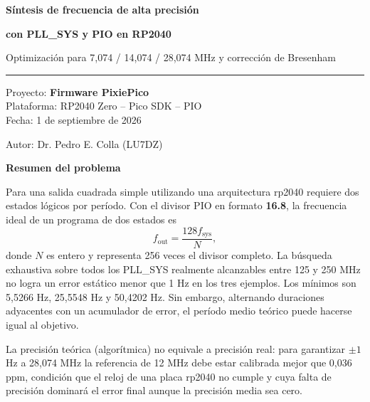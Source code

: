 \documentclass[10pt,a4paper]{article}
\begin{document}
\begin{titlepage}
\centering
\vspace*{14mm}
{\Huge\bfseries\color{navy}Síntesis de frecuencia de alta precisión\par}
\vspace{2mm}
{\Huge\bfseries\color{navy}con PLL\_SYS y PIO en RP2040\par}
\vspace{8mm}
{\large\color{graytext}Optimización para 7,074 / 14,074 / 28,074 MHz y corrección de Bresenham\par}
\vspace{8mm}
{\color{blue}\rule{0.82\textwidth}{1pt}}
\vspace{10mm}
{\large Proyecto: \textbf{Firmware PixiePico}\\
Plataforma: RP2040 Zero -- Pico SDK -- PIO\\
Fecha: 1 de septiembre de 2026\par}
Autor: Dr. Pedro E. Colla (LU7DZ)
\vspace{17mm}
\begin{minipage}{0.91\textwidth}
{\LARGE\bfseries\color{navy}Resumen del problema\par}
\vspace{3mm}
\begin{technicalbox}
Para una salida cuadrada simple utilizando una arquitectura rp2040 requiere dos estados lógicos por período.
Con el divisor PIO en formato \textbf{16.8}, la frecuencia ideal de un programa
de dos estados es
\[
 f_{\mathrm{out}}=\frac{128f_{\mathrm{sys}}}{N},
\]
donde \(N\) es entero y representa 256 veces el divisor completo. La búsqueda
exhaustiva sobre todos los PLL\_SYS realmente alcanzables entre 125 y 250 MHz
no logra un error estático menor que 1 Hz en los tres ejemplos. Los mínimos
son 5,5266 Hz, 25,5548 Hz y 50,4202 Hz. Sin embargo, alternando duraciones
adyacentes con un acumulador de error, el período medio teórico puede hacerse
igual al objetivo.
\end{technicalbox}
La precisión teórica (algorítmica) no equivale a precisión real: para garantizar
\(\pm1\) Hz a 28,074 MHz la referencia de 12 MHz debe estar calibrada mejor
que 0,036 ppm, condición que el reloj de una placa rp2040 no cumple y cuya falta de precisión
dominará el error final aunque la precisión media sea cero.
\end{minipage}
\vfill
\end{titlepage}
\end{document}
